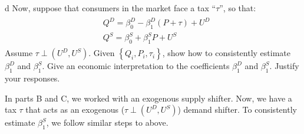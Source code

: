 \documentclass{article}
\begin{document}
\begin{problem}{d}
Now, suppose that consumers in the market face a tax ``$\tau$'', so that:
\begin{align*}
\begin{aligned}
    &Q^{D}=\beta_{0}^{D}-\beta_{1}^{D}(P+\tau)+U^{D} \\
    &Q^{S}=\beta_{0}^{S}+\beta_{1}^{S} P+U^{S}
\end{aligned}
\end{align*}
Assume $\tau \perp\left(U^{D}, U^{S}\right)$. Given $\left\{Q_{i}, P_{i}, \tau_{i}\right\}$, show how to consistently estimate $\beta_{1}^{D}$ and $\beta_{1}^{S}$. Give an economic interpretation to the coefficients $\beta_{1}^{D}$ and $\beta_{1}^{S}$. Justify your responses.
\end{problem}
\begin{solution}
In parts B and C, we worked with an exogenous supply shifter. Now, we have a tax $\tau$ that acts as an exogenous ($\tau \perp (U^D, U^S)$) demand shifter. To consistently estimate $\beta_1^S$, we follow similar steps to above.


\end{solution}
\end{document}
